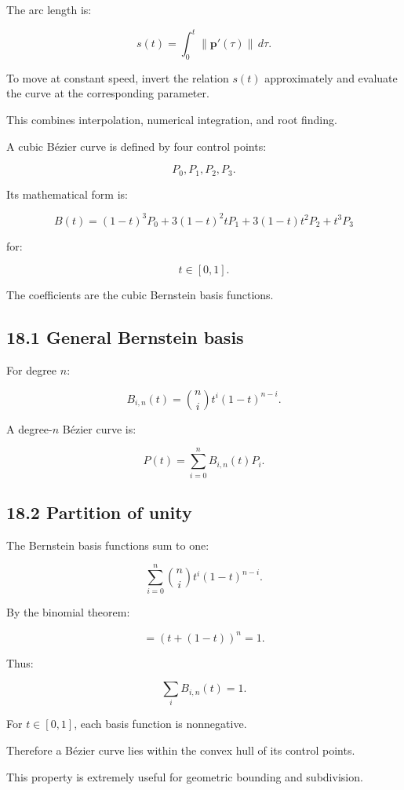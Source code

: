 The arc length is:

\[ \boxed{ s(t)=\int_0^t\|\mathbf p'(\tau)\|\,d\tau }. \]

To move at constant speed, invert the relation \(s(t)\) approximately and evaluate the curve at the corresponding parameter.

This combines interpolation, numerical integration, and root finding.

A cubic Bézier curve is defined by four control points:

\[ P_0,P_1,P_2,P_3. \]

Its mathematical form is:

\[ \boxed{ B(t)= (1-t)^3P_0+ 3(1-t)^2tP_1+ 3(1-t)t^2P_2+ t^3P_3 } \]

for:

\[ t\in[0,1]. \]

The coefficients are the cubic Bernstein basis functions.

\subsection{18.1 General Bernstein basis}\label{02-foundations-ii-ch028-general-bernstein-basis}

For degree \(n\):

\[ \boxed{ B_{i,n}(t)= \binom ni t^i(1-t)^{n-i} }. \]

A degree-\(n\) Bézier curve is:

\[ \boxed{ P(t)=\sum_{i=0}^{n}B_{i,n}(t)P_i }. \]

\subsection{18.2 Partition of unity}\label{02-foundations-ii-ch028-partition-of-unity}

The Bernstein basis functions sum to one:

\[ \sum_{i=0}^{n} \binom ni t^i(1-t)^{n-i}. \]

By the binomial theorem:

\[ =(t+(1-t))^n=1. \]

Thus:

\[ \boxed{ \sum_iB_{i,n}(t)=1 }. \]

For \(t\in[0,1]\), each basis function is nonnegative.

Therefore a Bézier curve lies within the convex hull of its control points.

This property is extremely useful for geometric bounding and subdivision.

